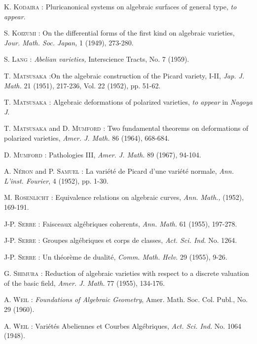 \begin{thebibliography}{99}
 \textsc{K. Kodaira :} Pluricanonical systems on algebraic surfaces of general type, {\em to appear.}

 \textsc{S. Koizumi :} On the differential forms of the first kind on algebraic varieties, {\em Jour. Math. Soc. Japan,} 1 (1949), 273-280.

 \textsc{S. Lang :} {\em Abelian varieties,} Interscience Tracts, No. 7 (1959).

 \textsc{T. Matsusaka :}\pageoriginale On the algebraic construction of the Picard variety, I-II, {\em Jap. J. Math.} 21 (1951), 217-236, Vol. 22 (1952), pp. 51-62.

 \textsc{T. Matsusaka :} Algebraic deformations of polarized varieties, {\em to appear} in {\em Nagoya J}.

 \textsc{T. Matsusaka} and \textsc{D. Mumford :} Two fundamental theorems on deformations of polarized varieties, {\em Amer. J. Math.} 86 (1964), 668-684.

 \textsc{D. Mumford :} Pathologies III, {\em Amer. J. Math.} 89 (1967), 94-104.

 \textsc{A. N\'eron} and \textsc{P. Samuel :} La vari\'et\'e de Picard d'une vari\'et\'e normale, {\em Ann. L'inst. Fourier}, 4 (1952), pp. 1-30.

 \textsc{M. Rosenlicht :} Equivalence relations on algebraic curves, {\em Ann. Math.,} (1952), 169-191.

 \textsc{J-P. Serre :} Faisceaux alg\'ebriques coherents, {\em Ann. Math.} 61 (1955), 197-278.

 \textsc{J-P. Serre :} Groupes alg\'ebriques et corps de classes, {\em Act. Sci. Ind.} No. 1264.

 \textsc{J-P. Serre :} Un th\'eor\`eme de dualit\'e, {\em Comm. Math. Helv.} 29 (1955), 9-26.

 \textsc{G. Shimura :} Reduction of algebraic varieties with respect to a discrete valuation of the basic field, {\em Amer. J. Math.} 77 (1955), 134-176.

 \textsc{A. Weil :} {\em Foundations of Algebraic Geometry}, Amer. Math. Soc. Col. Publ., No. 29 (1960).

 \textsc{A. Weil :} Vari\'et\'es Abeliennes et Courbes Alg\'ebriques, {\em Act. Sci. Ind.} No. 1064 (1948).


\end{thebibliography}
